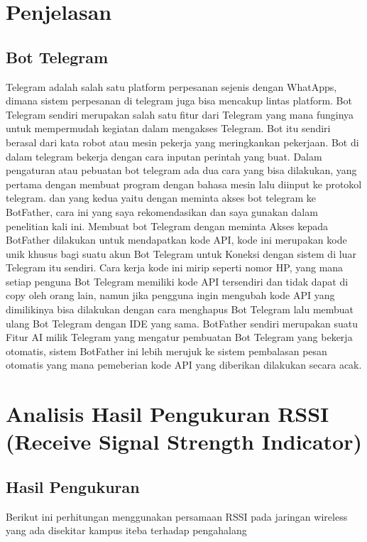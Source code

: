 \documentclass[conference]{IEEEtran}
\begin{document}
\section{Penjelasan}
\subsection{Bot Telegram}
    Telegram adalah salah satu platform perpesanan sejenis dengan
    WhatApps, dimana sistem perpesanan di telegram juga bisa mencakup
    lintas platform. Bot Telegram 
    sendiri merupakan salah satu fitur dari Telegram yang mana funginya untuk
    mempermudah kegiatan dalam mengakses Telegram. Bot itu sendiri
    berasal dari kata robot atau mesin pekerja yang meringkankan pekerjaan.
    Bot di dalam telegram bekerja dengan cara inputan perintah yang buat.
    Dalam pengaturan atau pebuatan bot telegram ada dua cara yang 
    bisa dilakukan, yang pertama dengan membuat program dengan bahasa
    mesin lalu diinput ke protokol telegram. dan yang kedua yaitu dengan
    meminta akses bot telegram ke BotFather, cara ini yang saya
    rekomendasikan dan saya gunakan dalam penelitian kali ini. Membuat bot
    Telegram dengan meminta Akses kepada BotFather dilakukan untuk
    mendapatkan kode API, kode ini merupakan kode unik khusus bagi suatu
    akun Bot Telegram untuk Koneksi dengan sistem di luar Telegram itu
    sendiri. Cara kerja kode ini mirip seperti nomor HP, yang mana setiap
    penguna Bot Telegram memiliki kode API tersendiri dan tidak dapat di copy
    oleh orang lain, namun jika pengguna ingin mengubah kode API yang
    dimilikinya bisa dilakukan dengan cara menghapus Bot Telegram lalu
    membuat ulang Bot Telegram dengan IDE yang sama.
    BotFather sendiri merupakan suatu Fitur AI milik Telegram yang
    mengatur pembuatan Bot Telegram yang bekerja otomatis, sistem
    BotFather ini lebih merujuk ke sistem pembalasan pesan otomatis yang
    mana pemeberian kode API yang diberikan dilakukan secara acak.\cite{thiar2020penerapan}

\section{Analisis Hasil Pengukuran RSSI (Receive Signal Strength Indicator)}
\subsection{Hasil Pengukuran}
Berikut ini perhitungan menggunakan persamaan RSSI 
pada jaringan wireless yang ada disekitar 
kampus iteba terhadap pengahalang
\end{document}
